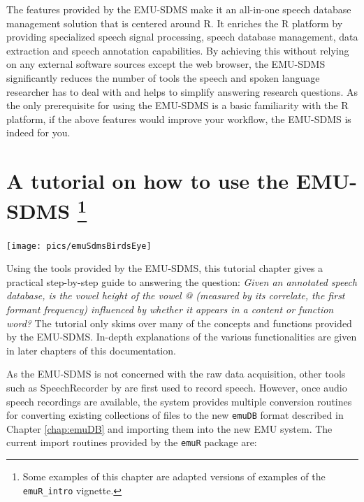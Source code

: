 \documentclass[]{book}
\begin{document}
The features provided by the EMU-SDMS make it an all-in-one speech database management solution that is centered around R. It enriches the R platform by providing specialized speech signal processing, speech database management, data extraction and speech annotation capabilities. By achieving this without relying on any external software sources except the web browser, the EMU-SDMS significantly reduces the number of tools the speech and spoken language researcher has to deal with and helps to simplify answering research questions. As the only prerequisite for using the EMU-SDMS is a basic familiarity with the R platform, if the above features would improve your workflow, the EMU-SDMS is indeed for you.

\hypertarget{chap:tutorial}{%
\chapter[A tutorial on how to use the EMU-SDMS ]{\texorpdfstring{A tutorial on how to use the EMU-SDMS \footnote{Some examples of this chapter are adapted versions of examples of the \texttt{emuR\_intro} vignette.}}{A tutorial on how to use the EMU-SDMS }}\label{chap:tutorial}}

\begin{center}\texttt{[image: pics/emuSdmsBirdsEye]} \end{center}

Using the tools provided by the EMU-SDMS, this tutorial chapter gives a practical step-by-step guide to answering the question: \emph{Given an annotated speech database, is the vowel height of the vowel @ (measured by its correlate, the first formant frequency) influenced by whether it appears in a content or function word?} The tutorial only skims over many of the concepts and functions provided by the EMU-SDMS. In-depth explanations of the various functionalities are given in later chapters of this documentation.

As the EMU-SDMS is not concerned with the raw data acquisition, other tools such as SpeechRecorder by \citet{draxler:2004a} are first used to record speech. However, once audio speech recordings are available, the system provides multiple conversion routines for converting existing collections of files to the new \texttt{emuDB} format described in Chapter \ref{chap:emuDB} and importing them into the new EMU system. The current import routines provided by the \texttt{emuR} package are:
\end{document}
